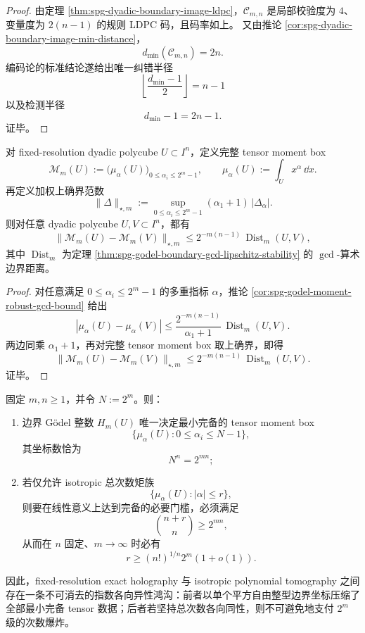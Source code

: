 \begin{proof}
由定理 \ref{thm:spg-dyadic-boundary-image-ldpc}，\(\mathcal C_{m,n}\) 是局部校验度为 \(4\)、变量度为 \(2(n-1)\) 的规则 LDPC 码，且码率如上。
又由推论 \ref{cor:spg-dyadic-boundary-image-min-distance}，
\[
d_{\min}(\mathcal C_{m,n})=2n.
\]
编码论的标准结论遂给出唯一纠错半径
\[
\left\lfloor\frac{d_{\min}-1}{2}\right\rfloor=n-1
\]
以及检测半径
\[
d_{\min}-1=2n-1.
\]
证毕。
\end{proof}

\begin{theorem}\label{thm:conclusion-boundary-arithmetic-distance-tensor-box-contraction}
对 fixed-resolution dyadic polycube \(U\subset I^n\)，定义完整 tensor moment box
\[
\mathcal M_m(U):=\bigl(\mu_\alpha(U)\bigr)_{0\le \alpha_i\le 2^m-1},
\qquad
\mu_\alpha(U):=\int_U x^\alpha\,\dd x.
\]
再定义加权上确界范数
\[
\|\Delta\|_{\star,m}
:=
\sup_{0\le \alpha_i\le 2^m-1}
(\alpha_1+1)\,|\Delta_\alpha|.
\]
则对任意 dyadic polycube \(U,V\subset I^n\)，都有
\[
\|\mathcal M_m(U)-\mathcal M_m(V)\|_{\star,m}
\le
2^{-m(n-1)}\,\operatorname{Dist}_m(U,V),
\]
其中 \(\operatorname{Dist}_m\) 为定理 \ref{thm:spg-godel-boundary-gcd-lipschitz-stability} 的 \(\gcd\)-算术边界距离。
\end{theorem}

\begin{proof}
对任意满足 \(0\le \alpha_i\le 2^m-1\) 的多重指标 \(\alpha\)，推论 \ref{cor:spg-godel-moment-robust-gcd-bound} 给出
\[
|\mu_\alpha(U)-\mu_\alpha(V)|
\le
\frac{2^{-m(n-1)}}{\alpha_1+1}\,\operatorname{Dist}_m(U,V).
\]
两边同乘 \(\alpha_1+1\)，再对完整 tensor moment box 取上确界，即得
\[
\|\mathcal M_m(U)-\mathcal M_m(V)\|_{\star,m}
\le
2^{-m(n-1)}\,\operatorname{Dist}_m(U,V).
\]
证毕。
\end{proof}

\begin{theorem}\label{thm:conclusion-exact-holography-vs-isotropic-tomography-anisotropy-gap}
固定 \(m,n\ge 1\)，并令 \(N:=2^m\)。则：
\begin{enumerate}
  \item 边界 Gödel 整数 \(H_m(U)\) 唯一决定最小完备的 tensor moment box
        \[
        \{\mu_\alpha(U):0\le \alpha_i\le N-1\},
        \]
        其坐标数恰为
        \[
        N^n=2^{mn};
        \]
  \item 若仅允许 isotropic 总次数矩族
        \[
        \{\mu_\alpha(U):|\alpha|\le r\},
        \]
        则要在线性意义上达到完备的必要门槛，必须满足
        \[
        \binom{n+r}{n}\ge 2^{mn},
        \]
        从而在 \(n\) 固定、\(m\to\infty\) 时必有
        \[
        r\ge (n!)^{1/n}2^m(1+o(1)).
        \]
\end{enumerate}
因此，fixed-resolution exact holography 与 isotropic polynomial tomography 之间存在一条不可消去的指数各向异性鸿沟：前者以单个平方自由整型边界坐标压缩了全部最小完备 tensor 数据；后者若坚持总次数各向同性，则不可避免地支付 \(2^m\) 级的次数爆炸。
\end{theorem}

